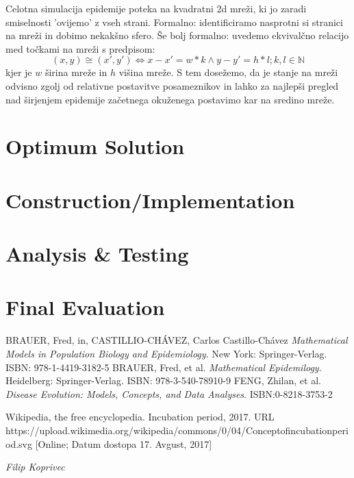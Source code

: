 \documentclass[a4paper, 11pt]{article}
\begin{document}
Celotna simulacija epidemije poteka na kvadratni 2d mreži, ki jo zaradi smiselnosti 'ovijemo' z vseh strani. Formalno: identificiramo nasprotni si stranici na mreži in dobimo nekakšno sfero. Še bolj formalno: uvedemo ekvivalčno relacijo med točkami na mreži s predpisom: 
$$(x,y) \cong (x',y') \iff x-x' = w*k \land y-y' = h*l; k,l \in \mathbb{N}$$
kjer je $w$ širina mreže in $h$ višina mreže. S tem dosežemo, da je stanje na mreži odvisno zgolj od relativne postavitve posameznikov in lahko za najlepši pregled nad širjenjem epidemije začetnega okuženega postavimo kar na sredino mreže.

\section*{Optimum Solution}
\lipsum[4]

\section*{Construction/Implementation}
\lipsum[5]

\section*{Analysis \& Testing}
\lipsum[6]

\section*{Final Evaluation}
\lipsum[7]


\begin{thebibliography}{9}
 BRAUER, Fred, in, CASTILLIO-CHÁVEZ, Carlos Castillo-Chávez \emph{Mathematical Models in Population Biology and Epidemiology}. New York: Springer-Verlag. ISBN: 978-1-4419-3182-5
  BRAUER, Fred, et al. \emph{Mathematical Epidemilogy}. Heidelberg: Springer-Verlag. ISBN: 978-3-540-78910-9
 FENG, Zhilan, et al. \emph{Disease Evolution: Models, Concepts, and Data Analyses}. ISBN:0-8218-3753-2

 Wikipedia, the free encyclopedia. Incubation period, 2017. URL https://upload.wikimedia.org/wikipedia/commons/0/04/Concept\textunderscore of\textunderscore incubation\textunderscore period.svg [Online; Datum dostopa 17. Avgust, 2017]
\end{thebibliography}


\hfill \textit{Filip Koprivec}
\end{document}
